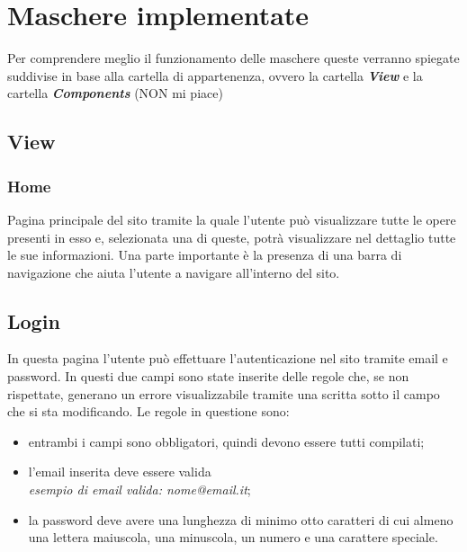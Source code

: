 \section{Maschere implementate}

Per comprendere meglio il funzionamento delle maschere queste verranno spiegate suddivise in base alla cartella di appartenenza, ovvero la cartella \textbf{\textit{View}} e la cartella \textbf{\textit{Components}} (NON mi piace)

\subsection{View}
\subsubsection{Home}
Pagina principale del sito tramite la quale l'utente può visualizzare tutte le opere presenti in esso e, selezionata una di queste, potrà visualizzare nel dettaglio tutte le sue informazioni. Una parte importante è la presenza di una barra di navigazione che aiuta l'utente a navigare all'interno del sito.
\subsection{Login}
In questa pagina l'utente può effettuare l'autenticazione nel sito tramite email e password. In questi due campi sono state inserite delle regole che, se non rispettate, generano un errore visualizzabile tramite una scritta sotto il campo che si sta modificando. Le regole in questione sono:
\begin{itemize}
	\item entrambi i campi sono obbligatori, quindi devono essere tutti compilati;
	\item l'email inserita deve essere valida\\
	\textit{esempio di email valida: nome@email.it};
	\item la password deve avere una lunghezza di minimo otto caratteri di cui almeno una lettera maiuscola, una minuscola, un numero e una carattere speciale.
\end{itemize}
